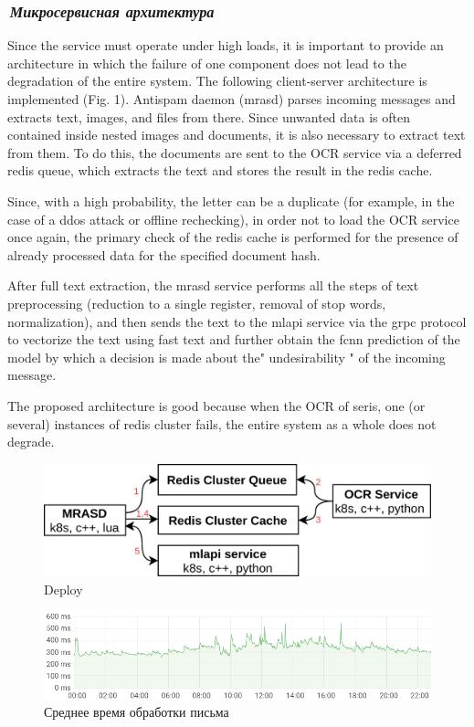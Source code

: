 \documentclass[12pt]{article}
\begin{document}
\subsubsection*{\it\,Микросервисная архитектура}

Since the service must operate under high loads, it is important to provide an architecture in which the failure of one component does not lead to the degradation of the entire system. The following client-server architecture is implemented (Fig. 1). Antispam daemon (mrasd) parses incoming messages and extracts text, images, and files from there. Since unwanted data is often contained inside nested images and documents, it is also necessary to extract text from them. To do this, the documents are sent to the OCR service via a deferred redis queue, which extracts the text and stores the result in the redis cache.

Since, with a high probability, the letter can be a duplicate (for example, in the case of a ddos attack or offline rechecking), in order not to load the OCR service once again, the primary check of the redis cache is performed for the presence of already processed data for the specified document hash.

After full text extraction, the mrasd service performs all the steps of text preprocessing (reduction to a single register, removal of stop words, normalization), and then sends the text to the mlapi service via the grpc protocol to vectorize the text using fast text and further obtain the fcnn prediction of the model by which a decision is made about the" undesirability " of the incoming message.

The proposed architecture is good because when the OCR of seris, one (or several) instances of redis cluster fails, the entire system as a whole does not degrade.
 
\begin{figure}[h!]
	\center
	\includegraphics[scale=0.25]{deploy.jpg}
	\caption{Deploy}
	\label{fig:02}
\end{figure}


\begin{figure}[h!]
	\center
	\includegraphics[scale=0.6]{timings.png}
	\caption{Среднее время обработки письма}
	\label{fig:03}
\end{figure}
\end{document}
